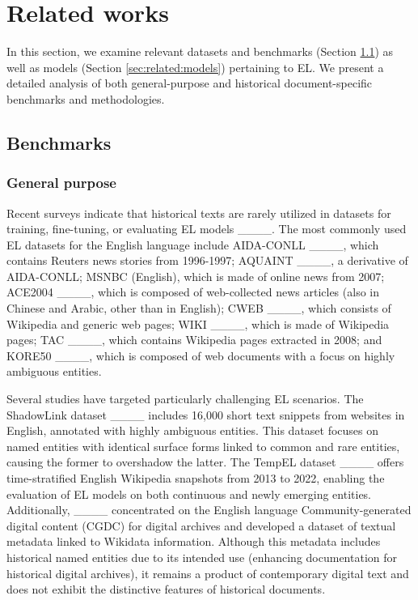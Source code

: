 \section{Related works}
\label{sec:related}
In this section, we examine relevant datasets and benchmarks (Section \ref{sec:related:bench}) as well as models (Section \ref{sec:related:models}) pertaining to EL. We present a detailed analysis of both general-purpose and historical document-specific benchmarks and methodologies.

\subsection{Benchmarks} \label{sec:related:bench}
\subsubsection*{General purpose}
Recent surveys indicate that historical texts are rarely utilized in datasets for training, fine-tuning, or evaluating EL models ____. The most commonly used EL datasets for the English language include AIDA-CONLL ____, which contains Reuters news stories from 1996-1997; AQUAINT ____, a derivative of AIDA-CONLL; MSNBC (English), which is made of online news from 2007; ACE2004 ____, which is composed of web-collected news articles (also in Chinese and Arabic, other than in English); CWEB ____, which consists of Wikipedia and generic web pages; WIKI ____, which is made of Wikipedia pages; TAC ____, which contains Wikipedia pages extracted in 2008; and KORE50 ____, which is composed of web documents with a focus on highly ambiguous entities.

Several studies have targeted particularly challenging EL scenarios. The ShadowLink dataset ____ includes 16,000 short text snippets from websites in English, annotated with highly ambiguous entities. This dataset focuses on named entities with identical surface forms linked to common and rare entities, causing the former to overshadow the latter. The TempEL dataset ____ offers time-stratified English Wikipedia snapshots from 2013 to 2022, enabling the evaluation of EL models on both continuous and newly emerging entities. Additionally, ____ concentrated on the English language Community-generated digital content (CGDC) for digital archives and developed a dataset of textual metadata linked to Wikidata information. Although this metadata includes historical named entities due to its intended use (enhancing documentation for historical digital archives), it remains a product of contemporary digital text and does not exhibit the distinctive features of historical documents.

